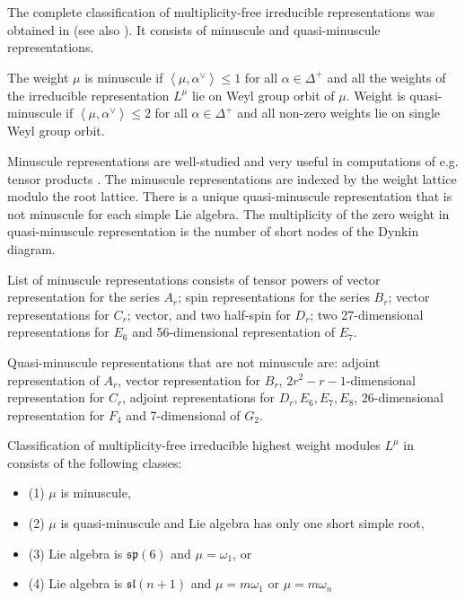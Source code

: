 \documentclass{article}
\begin{document}
The complete classification of multiplicity-free irreducible representations was obtained in
\cite{howe1995perspectives} (see also \cite{stembridge2003multiplicity}). It consists of minuscule
and quasi-minuscule representations.

The weight $\mu$ is minuscule if $\left<\mu,\alpha^{\vee}\right>\leq 1$ for all $\alpha\in
\Delta^{+}$ and all the weights of the irreducible representation $L^{\mu}$ lie on Weyl
group orbit of $\mu$. Weight is quasi-minuscule if $\left<\mu,\alpha^{\vee}\right>\leq 2$ for all
$\alpha\in \Delta^{+}$ and all non-zero weights lie on single Weyl group orbit.

Minuscule representations are well-studied and very useful in computations of e.g. tensor products
\cite{stembridge2003multiplicity,stembridge2001computational}. The minuscule representations are
indexed by the weight lattice modulo the root lattice. There is a unique quasi-minuscule
representation that is not minuscule for each simple Lie algebra. The multiplicity of the zero 
weight in quasi-minuscule representation is the number of short nodes of the Dynkin diagram.

List of minuscule representations consists of tensor powers of vector
representation for the series $A_{r}$; spin representations for the series
$B_{r}$; vector representations for $C_{r}$; vector, and two half-spin for $D_{r}$; two
27-dimensional representations for $E_{6}$ and 56-dimensional representation of $E_{7}$. 

Quasi-minuscule representations that are not minuscule are: adjoint representation of $A_{r}$,
vector representation for $B_{r}$, $2r^{2}-r-1$-dimensional representation for $C_{r}$, adjoint
representations for $D_{r}, E_{6}, E_{7}, E_{8}$, 26-dimensional representation for $F_{4}$ and
7-dimensional of $G_{2}$.


Classification of multiplicity-free irreducible highest weight modules $L^{\mu}$ in
\cite{howe1995perspectives,stembridge2003multiplicity} consists of the following classes:
\begin{itemize}
\item (1) $\mu$ is minuscule,
\item (2) $\mu$ is quasi-minuscule and Lie algebra has only one short simple root,
\item (3) Lie algebra is $\mathfrak{sp}(6)$ and $\mu=\omega_{1}$, or
\item (4) Lie algebra is $\mathfrak{sl}(n + 1)$ and  $\mu= m\omega_{1}$ or $\mu  = m\omega_{n}$ 
\end{itemize}
\end{document}
